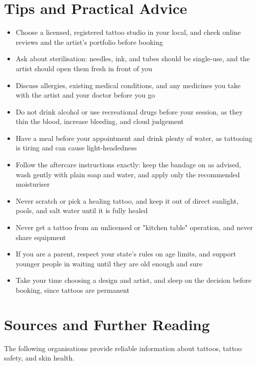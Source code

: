 \section*{Tips and Practical Advice}
\begin{itemize}
    \item Choose a licensed, registered tattoo studio in your local, and check online reviews and the artist's portfolio before booking
    \item Ask about sterilisation: needles, ink, and tubes should be single-use, and the artist should open them fresh in front of you
    \item Discuss allergies, existing medical conditions, and any medicines you take with the artist and your doctor before you go
    \item Do not drink alcohol or use recreational drugs before your session, as they thin the blood, increase bleeding, and cloud judgement
    \item Have a meal before your appointment and drink plenty of water, as tattooing is tiring and can cause light-headedness
    \item Follow the aftercare instructions exactly: keep the bandage on as advised, wash gently with plain soap and water, and apply only the recommended moisturiser
    \item Never scratch or pick a healing tattoo, and keep it out of direct sunlight, pools, and salt water until it is fully healed
    \item Never get a tattoo from an unlicensed or "kitchen table" operation, and never share equipment
    \item If you are a parent, respect your state's rules on age limits, and support younger people in waiting until they are old enough and sure
    \item Take your time choosing a design and artist, and sleep on the decision before booking, since tattoos are permanent
\end{itemize}

\section*{Sources and Further Reading}
The following organisations provide reliable information about tattoos, tattoo safety, and skin health.


